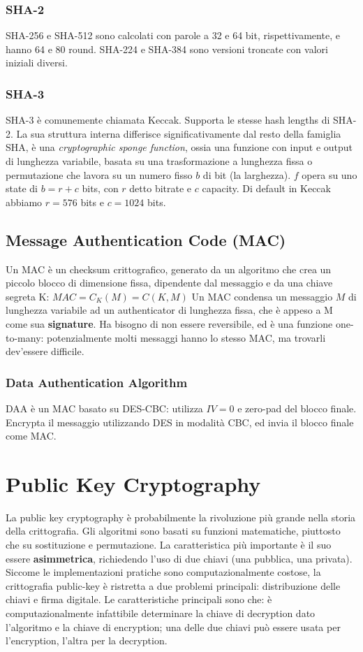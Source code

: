 \documentclass[11pt]{article}
\begin{document}
\subsubsection{SHA-2}
SHA-256 e SHA-512 sono calcolati con parole a 32 e 64 bit, rispettivamente, e hanno 64 e 80 round. SHA-224 e SHA-384 sono versioni troncate con valori iniziali diversi.
\subsubsection{SHA-3}
SHA-3 è comunemente chiamata Keccak. Supporta le stesse hash lengths di SHA-2. La sua struttura interna differisce significativamente dal resto della famiglia SHA, è una \textit{cryptographic sponge function}, ossia una funzione con input e output di lunghezza variabile, basata su una trasformazione a lunghezza fissa o permutazione che lavora su un numero fisso $b$ di bit (la larghezza). $f$ opera su uno state di $b=r+c$ bits, con $r$ detto bitrate e $c$ capacity. Di default in Keccak abbiamo $r=576$ bits e $c=1024$ bits. 
\subsection{Message Authentication Code (MAC)}
Un MAC è un checksum crittografico, generato da un algoritmo che crea un piccolo blocco di dimensione fissa, dipendente dal messaggio e da una chiave segreta K: $MAC=C_K(M)=C(K,M)$
Un MAC condensa un messaggio $M$ di lunghezza variabile ad un authenticator di lunghezza fissa, che è appeso a M come sua \textbf{signature}. Ha bisogno di non essere reversibile, ed è una funzione one-to-many: potenzialmente molti messaggi hanno lo stesso MAC, ma trovarli dev'essere difficile. 
\subsubsection{Data Authentication Algorithm}
DAA è un MAC basato su DES-CBC: utilizza $IV=0$ e zero-pad del blocco finale. Encrypta il messaggio utilizzando DES in modalità CBC, ed invia il blocco finale come MAC. 
\section{Public Key Cryptography}
La public key cryptography è probabilmente la rivoluzione più grande nella storia della crittografia. Gli algoritmi sono basati su funzioni matematiche, piuttosto che su sostituzione e permutazione. La caratteristica più importante è il suo essere \textbf{asimmetrica}, richiedendo l'uso di due chiavi (una pubblica, una privata). Siccome le implementazioni pratiche sono computazionalmente costose, la crittografia public-key è ristretta a due problemi principali: distribuzione delle chiavi e firma digitale. Le caratteristiche principali sono che: è computazionalmente infattibile determinare la chiave di decryption dato l'algoritmo e la chiave di encryption; una delle due chiavi può essere usata per l'encryption, l'altra per la decryption. 
\end{document}
